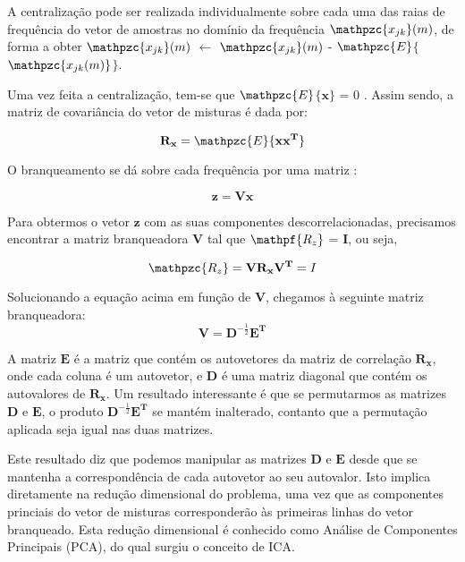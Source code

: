         A centralização pode ser realizada individualmente sobre cada uma das raias de frequência do vetor de amostras no domínio da frequência $\mathpzc{x_{jk}}(m)$, de forma a obter $\mathpzc{x_{jk}}(m)$ $\leftarrow$ $\mathpzc{x_{jk}}(m)$ - $\mathpzc{E}$$\{$$\mathpzc{x_{jk}(m)}$$\}$.
        
        Uma vez feita a centralização, tem-se que $\mathpzc{E}$$\{$$\mathbf{x}$$\}$ = 0 . Assim sendo, a matriz de covariância do vetor de misturas é dada por:
        
        \begin{equation}\label{eq:covariance}
            \mathbf{R_x} = \mathpzc{E}\{\mathbf{xx^T}\}
        \end{equation}
        
        O branqueamento se dá sobre cada frequência por uma matriz :
        
        \begin{equation}\label{eq:whiteningfrequency}
            \mathbf{z} = \mathbf{V}\mathbf{x}
        \end{equation}
        
        Para obtermos o vetor $\mathbf{z}$ com as suas componentes descorrelacionadas, precisamos encontrar a matriz branqueadora $\mathbf{V}$ tal que $\mathpf{R_z}$ = $\mathbf{I}$, ou seja,

        \begin{equation}
            \label{whiteningproof}
        \mathpzc{R_z} = \mathbf{V}\mathbf{R_x}\mathbf{V^T} = I 
        \end{equation}

        Solucionando a equação acima em função de $\mathbf{V}$, chegamos à seguinte matriz branqueadora:
        \begin{equation}\label{eq:vk}
            \mathbf{V} = \mathbf{D}^{-\frac{1}{2}}\mathbf{E^T}
        \end{equation}
        
        A matriz $\mathbf{E}$ é a matriz que contém os autovetores da matriz de correlação $\mathbf{R_x}$, onde cada coluna é um autovetor, e $\mathbf{D}$ é uma matriz diagonal que contém os autovalores de $\mathbf{R_x}$. Um resultado interessante é que se permutarmos as matrizes $\mathbf{D}$ e $\mathbf{E}$, o produto $\mathbf{D}^{-\frac{1}{2}}\mathbf{E^T}$ se mantém inalterado, contanto que a permutação aplicada seja igual nas duas matrizes.
        
        Este resultado diz que podemos manipular as matrizes $\mathbf{D}$ e $\mathbf{E}$ desde que se mantenha a correspondência de cada autovetor ao seu autovalor. Isto implica diretamente na redução dimensional do problema, uma vez que as componentes princiais do vetor de misturas corresponderão às primeiras linhas do vetor branqueado. Esta redução dimensional é conhecido como Análise de Componentes Principais (PCA), do qual surgiu o conceito de ICA. 
        
